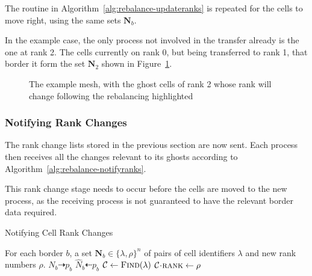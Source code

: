 \documentclass[twoside]{IIBproject}
\newcommand{\vect} [1] {\bm{#1}}
\newcommand{\dra}{\dashrightarrow}
\newcommand{\dla}{\dashleftarrow}
\newcommand{\acc}{{\mkern 0.5mu\cdot\mkern 0.5mu}}
\numberwithin{figure}{section}
\begin{document}
            The routine in Algorithm~\ref{alg:rebalance-updateranks} is repeated for the cells to move right, using the same sets $\vect{N}_b$.

            In the example case, the only process not involved in the transfer already is the one at rank 2. The cells currently on rank 0, but being transferred to rank 1, that border it form the set $\vect{N}_2$ shown in Figure~\ref{fig:rebalance-notify}.

            \begin{figure}[H]
                
                \caption{The example mesh, with the ghost cells of rank 2 whose rank will change following the rebalancing highlighted}
                \label{fig:rebalance-notify}
            \end{figure}



        \subsubsection{Notifying Rank Changes} %
            \label{sec:rebalancing-notifyrank}

            The rank change lists stored in the previous section are now sent. Each process then receives all the changes relevant to its ghosts according to Algorithm~\ref{alg:rebalance-notifyranks}.

            This rank change stage needs to occur before the cells are moved to the new process, as the receiving process is not guaranteed to have the relevant border data required.

            \begin{algorithm}[H]
                \caption{Notifying Cell Rank Changes}
                \label{alg:rebalance-notifyranks}

                \begin{algorithmic}
                    \Require For each border $b$, a set $\vect{N}_b \in \{\lambda,\rho\}^n$ of pairs of cell identifiers $\lambda$ and new rank numbers $\rho$.
                    \Statex
                        \Send $N_b \dra p_b$
                    \EndFor
                    \Statex
                        \Recv $\hat N_b \dla p_b$
                            \State $\mathcal{C}\gets\textproc{Find}(\lambda)$
                            \State $\mathcal{C}\acc\textproc{rank} \gets \rho$
                        \EndFor
                    \EndFor
                \end{algorithmic}
            \end{algorithm}
\end{document}

